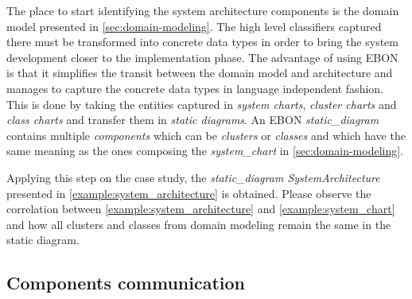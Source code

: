 \documentclass[conference]{IEEEtran}
\begin{document}
The place to start identifying the system architecture components is
the domain model presented in \autoref{sec:domain-modeling}. The high
level classifiers captured there must be transformed into concrete
data types in order to bring the system development closer to the
implementation phase. The advantage of using EBON is that it
simplifies the transit between the domain model and architecture
and manages to capture the concrete data types in language
independent fashion. This is done by taking the entities captured in
\emph{system charts}, \emph{cluster charts} and \emph{class charts} and
transfer them in \emph{static diagrams}. An EBON \emph{static\_diagram}
contains multiple \emph{components} which can be \emph{clusters} or
\emph{classes} and which have the same meaning as the ones composing the
\emph{system\_chart} in \autoref{sec:domain-modeling}.



Applying this step on the case study, the \emph{static\_diagram
SystemArchitecture} presented in \autoref{example:system_architecture}
is obtained. Please observe the correlation between
\autoref{example:system_architecture} and
\autoref{example:system_chart} and how all clusters and classes from
domain modeling remain the same in the static diagram.

%
\subsection{Components communication}
\label{sec:comp-comm}
\end{document}
